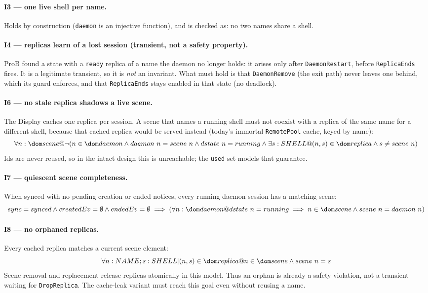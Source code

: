\documentclass[a4paper,10pt,fleqn]{article}
\begin{document}
\paragraph{I3 --- one live shell per name.}
Holds by construction (\texttt{daemon} is an injective function), and is
checked as: no two names share a shell.

\paragraph{I4 --- replicas learn of a lost session (transient, not a safety property).}
ProB found a state with a \texttt{ready} replica of a name the daemon
no longer holds: it arises only after \texttt{DaemonRestart}, before
\texttt{ReplicaEnds} fires.  It is a legitimate transient, so it is
\emph{not} an invariant.  What must hold is that \texttt{DaemonRemove}
(the exit path) never leaves one behind, which its guard enforces, and
that \texttt{ReplicaEnds} stays enabled in that state (no deadlock).

\paragraph{I6 --- no stale replica shadows a live scene.}
The Display caches one replica per session.  A scene that names a running
shell must not coexist with a replica of the same name for a different
shell, because that cached replica would be served instead (today's
immortal \texttt{RemotePool} cache, keyed by name):
\[
  \forall n : \dom scene @ \lnot (n \in \dom daemon \land
    daemon~n = scene~n \land dstate~n = running \land
    \exists s : SHELL @ (n , s) \in \dom replica \land s \neq scene~n)
\]
Ids are never reused, so in the intact design this is unreachable; the
\texttt{used} set models that guarantee.

\paragraph{I7 --- quiescent scene completeness.}
When synced with no pending creation or ended notices, every running daemon
session has a matching scene:
\[
  sync = synced \land createdEv = \emptyset \land endedEv = \emptyset
  \implies (\forall n : \dom daemon @ dstate~n = running \implies
    n \in \dom scene \land scene~n = daemon~n)
\]

\paragraph{I8 --- no orphaned replicas.}
Every cached replica matches a current scene element:
\[
  \forall n : NAME; s : SHELL | (n , s) \in \dom replica @
    n \in \dom scene \land scene~n = s
\]
Scene removal and replacement release replicas atomically in this model.
Thus an orphan is already a safety violation, not a transient waiting for
\texttt{DropReplica}. The cache-leak variant must reach this goal even
without reusing a name.
\end{document}
